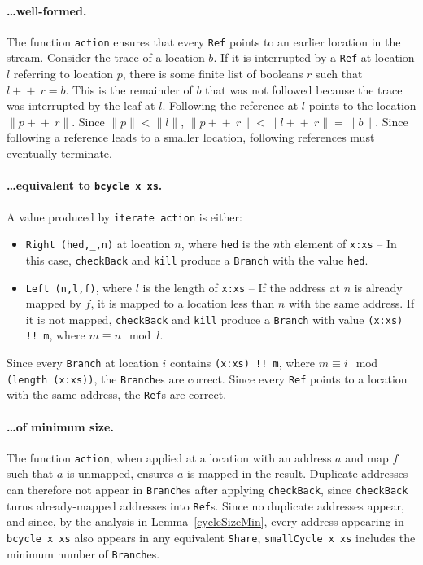 \documentclass[envcountsect]{llncs}
\newcommand{\ord}[1]{\|#1\|}
\newcommand{\app}{+\!\!\!+\ }
\begin{document}
\paragraph{\ldots well-formed.}
The function {\tt action} ensures that every {\tt Ref} points to an earlier location in the stream.
Consider the trace of a location $b$.
If it is interrupted by a {\tt Ref} at location $l$ referring to location $p$, there is some finite list of booleans $r$ such that $l \app r = b$.
This is the remainder of $b$ that was not followed because the trace was interrupted by the leaf at $l$.
Following the reference at $l$ points to the location $\ord{p \app r}$.
Since $\ord{p} < \ord{l}$, $\ord{p \app r} < \ord{l \app r} = \ord{b}$.
Since following a reference leads to a smaller location, following references must eventually terminate.

\paragraph{\ldots equivalent to {\tt bcycle x xs}.}
A value produced by {\tt iterate action} is either:

\begin{itemize}

\item {\tt Right (hed,\_,n)} at location $n$, where {\tt hed} is the $n$th element of {\tt x:xs} 
-- In this case, {\tt checkBack} and {\tt kill} produce a {\tt Branch} with the value {\tt hed}.

\item {\tt Left (n,l,f)}, where $l$ is the length of {\tt x:xs}
-- If the address at $n$ is already mapped by $f$, it is mapped to a location less than $n$ with the same address.
If it is not mapped, {\tt checkBack} and {\tt kill} produce a {\tt Branch} with value {\tt (x:xs) !! m}, where $m \equiv n \mod l$.

\end{itemize}

Since every {\tt Branch} at location $i$ contains {\tt (x:xs) !! m}, where $m \equiv i \mod\ ${\tt (length (x:xs))}, the {\tt Branch}es are correct.
Since every {\tt Ref} points to a location with the same address, the {\tt Ref}s are correct.

\paragraph{\ldots of minimum size.}
The function {\tt action}, when applied at a location with an address $a$ and map $f$ such that $a$ is unmapped, ensures $a$ is mapped in the result.
Duplicate addresses can therefore not appear in {\tt Branch}es after applying {\tt checkBack}, since {\tt checkBack} turns already-mapped addresses into {\tt Ref}s.
Since no duplicate addresses appear, and since, by the analysis in Lemma~\ref{cycleSizeMin}, every address appearing in {\tt bcycle x xs} also appears in any equivalent {\tt Share}, {\tt smallCycle x xs} includes the minimum number of {\tt Branch}es.
\end{document}
